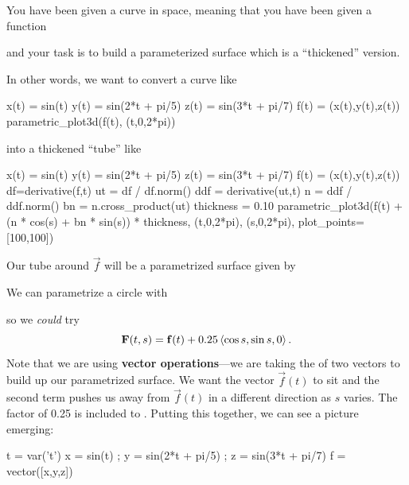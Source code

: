 \documentclass{ximera}
\begin{document}
\begin{example}
  You have been given a curve in space, meaning that you have been
  given a function
  \begin{multipleChoice}
  \end{multipleChoice}
  and your task is to build a parameterized surface which is a
  ``thickened'' version.
  
  In other words, we want to convert a curve like
  \begin{sageCell}
x(t) = sin(t)
y(t) = sin(2*t + pi/5)
z(t) = sin(3*t + pi/7)
f(t) = (x(t),y(t),z(t))
parametric_plot3d(f(t), (t,0,2*pi))
  \end{sageCell}
  into a thickened ``tube'' like
  \begin{sageOutput}
x(t) = sin(t)
y(t) = sin(2*t + pi/5)
z(t) = sin(3*t + pi/7)
f(t) = (x(t),y(t),z(t))
df=derivative(f,t)
ut = df / df.norm()
ddf = derivative(ut,t)
n = ddf / ddf.norm()
bn = n.cross_product(ut)
thickness = 0.10
parametric_plot3d(f(t) + (n * cos(s) + bn * sin(s)) * thickness, (t,0,2*pi), (s,0,2*pi), plot_points=[100,100])
  \end{sageOutput}

  Our tube around $\vec{f}$ will be a parametrized surface given by 
  \begin{multipleChoice}
  \end{multipleChoice}

  We can parametrize a circle with
  \begin{multipleChoice}
  \end{multipleChoice}
  so we \textit{could} try
  \[
    \mathbf{F}(t,s) = \mathbf{f}(t) + 0.25 \left\langle \cos s, \sin s, 0\right\rangle.
  \]
  Note that we are using \textbf{vector operations}---we are taking the
 of two vectors to build up our parametrized surface.  We want the vector $\vec{f}(t)$ to sit  and the second term pushes us away from $\vec{f}(t)$ in a different direction as $s$ varies.  The factor of 0.25 is included to .  Putting this together, we can see a picture emerging:
  \begin{sageCell}
t = var('t')
x = sin(t) ; y = sin(2*t + pi/5) ; z = sin(3*t + pi/7)
f = vector([x,y,z])


\end{sageCell}
\end{example}
\end{document}
